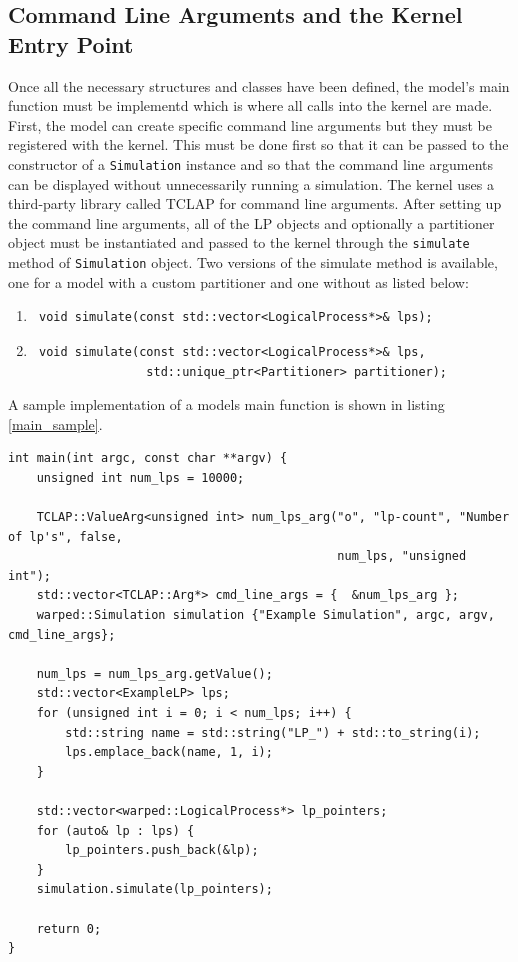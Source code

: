 \documentclass[11pt]{book}
\begin{document}
\subsection{Command Line Arguments and the Kernel Entry Point}

Once all the necessary structures and classes have been defined, the model's main function
must be implementd which is where all calls into the kernel are made. First, the model can create
specific command line arguments but they must be registered with the kernel. This must be done
first so that it can be passed to the constructor of a \texttt{Simulation} instance and so that
the command line arguments can be displayed without unnecessarily running a simulation. The
kernel uses a third-party library called TCLAP for command line arguments. After setting
up the command line arguments, all of the LP objects and optionally a partitioner object must
be instantiated and passed to the kernel through the \texttt{simulate} method of
\texttt{Simulation} object. Two versions of the simulate method is available, one for a model
with a custom partitioner and one without as listed below:

\begin{enumerate}
    \item \begin{verbatim} void simulate(const std::vector<LogicalProcess*>& lps); \end{verbatim}
    \item \begin{verbatim} void simulate(const std::vector<LogicalProcess*>& lps,
                std::unique_ptr<Partitioner> partitioner); \end{verbatim}
\end{enumerate}

\noindent
A sample implementation of a models main function is shown in listing \ref{main_sample}.

\begin{lstlisting}[caption=Exmple \textsc{warped2} Main Definition, label=main_sample, float]
int main(int argc, const char **argv) {
    unsigned int num_lps = 10000;

    TCLAP::ValueArg<unsigned int> num_lps_arg("o", "lp-count", "Number of lp's", false,
                                              num_lps, "unsigned int");
    std::vector<TCLAP::Arg*> cmd_line_args = {  &num_lps_arg };
    warped::Simulation simulation {"Example Simulation", argc, argv, cmd_line_args};

    num_lps = num_lps_arg.getValue();
    std::vector<ExampleLP> lps;
    for (unsigned int i = 0; i < num_lps; i++) {
        std::string name = std::string("LP_") + std::to_string(i);
        lps.emplace_back(name, 1, i);
    }

    std::vector<warped::LogicalProcess*> lp_pointers;
    for (auto& lp : lps) {
        lp_pointers.push_back(&lp);
    }
    simulation.simulate(lp_pointers);

    return 0;
}
\end{lstlisting}
\end{document}
